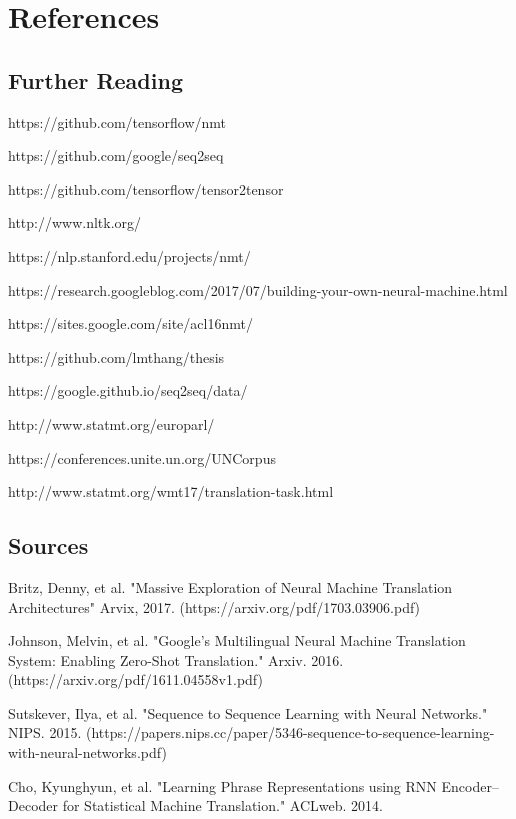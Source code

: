 \documentclass[10pt,a4paper]{article}
\begin{document}
\clearpage
\section{References}


\subsection{Further Reading}

https://github.com/tensorflow/nmt

https://github.com/google/seq2seq

https://github.com/tensorflow/tensor2tensor

http://www.nltk.org/

https://nlp.stanford.edu/projects/nmt/

https://research.googleblog.com/2017/07/building-your-own-neural-machine.html

https://sites.google.com/site/acl16nmt/

https://github.com/lmthang/thesis

https://google.github.io/seq2seq/data/

http://www.statmt.org/europarl/

https://conferences.unite.un.org/UNCorpus

http://www.statmt.org/wmt17/translation-task.html


\subsection{Sources}


Britz, Denny, et al. "Massive Exploration of Neural Machine Translation Architectures" Arvix, 2017.
(https://arxiv.org/pdf/1703.03906.pdf)
\newline

Johnson, Melvin, et al. "Google’s Multilingual Neural Machine Translation System: Enabling Zero-Shot Translation." Arxiv. 2016.
(https://arxiv.org/pdf/1611.04558v1.pdf)
\newline

Sutskever, Ilya, et al. "Sequence to Sequence Learning with Neural Networks." NIPS. 2015.
(https://papers.nips.cc/paper/5346-sequence-to-sequence-learning-with-neural-networks.pdf)
\newline

Cho, Kyunghyun, et al. "Learning Phrase Representations using RNN Encoder–Decoder for Statistical Machine Translation." ACLweb. 2014.
\end{document}
